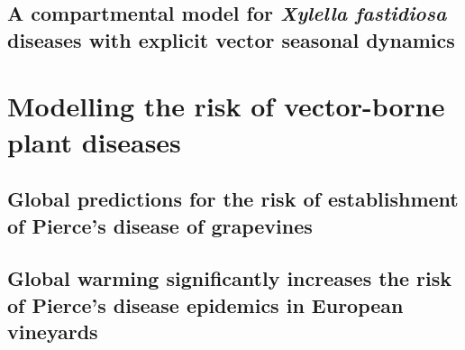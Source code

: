 \documentclass[
	10pt, %
	fleqn, %
	a4paper, %
]{LegrandOrangeBook}
\begin{document}
\chapter{A compartmental model for \textit{Xylella fastidiosa} diseases with
  explicit vector seasonal dynamics}
%


\part{Modelling the risk of vector-borne plant diseases}
\chapterspaceabove{6.75cm}
\chapterspacebelow{7.25cm}

\chapter{Global predictions for the risk of establishment of Pierce’s disease
  of grapevines}
%

\chapterspaceabove{6.75cm}
\chapterspacebelow{7.25cm}

\chapter{Global warming significantly increases the risk of Pierce's disease
  epidemics in European vineyards}
%

\chapterspaceabove{6.75cm}
\chapterspacebelow{7.25cm}
\end{document}
